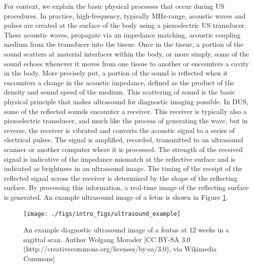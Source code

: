 For context, we explain the basic physical processes that occur during
\ac{US} procedures. In practice, high-frequency, typically MHz-range,
acoustic waves and pulses are created at the surface of the body using
a piezoelectric \ac{US} transducer. These acoustic waves, propagate
via an impedance matching, acoustic coupling medium from the
transducer into the tissue. Once in the tissue, a portion of the sound
scatters at material interfaces within the body, or more simply, some
of the sound echoes whenever it moves from one tissue to another or
encounters a cavity in the body. More precisely put, a portion of the
sound is reflected when it encounters a change in the acoustic
impedance, defined as the product of the density and sound speed of
the medium. This scattering of sound is the basic physical principle
that makes ultrasound for diagnostic imaging possible. In \ac{DUS},
some of the reflected sounds encounter a receiver. This receiver is
typically also a piezoelectric transducer, and much like the process
of generating the wave, but in reverse, the receiver is vibrated and
converts the acoustic signal to a series of electrical pulses. The
signal is amplified, recorded, transmitted to an ultrasound scanner or
another computer where it is processed. The strength of the received
signal is indicative of the impedance mismatch at the reflective
surface and is indicated as brightness in an ultrasound image. The
timing of the receipt of the reflected signal across the receiver is
determined by the shape of the reflecting surface. By processing this
information, a real-time image of the reflecting surface is
generated. An example ultrasound image of a fetus is shown in Figure
\ref{fig:fetus_example}.

\begin{figure}
  \centering
  \texttt{[image: ./figs/intro\_figs/ultrasound\_example]}
  \caption[An example diagnostic ultrasound image of a featus at 12
  weeks in a sagittal scan.]{An example diagnostic ultrasound image of
    a featus at 12 weeks in a sagittal scan. Author Wolgang Moroder
    [CC BY-SA 3.0 (http://creativecommons.org/licenses/by-sa/3.0),
    via Wikimedia Commons]}
  \label{fig:fetus_example}
\end{figure}

